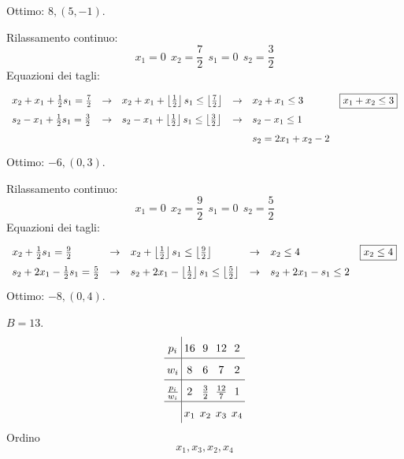 Ottimo: $8,( 5,-1)$.


\Es

Rilassamento continuo:
\begin{equation*}
x_{1} =0\ \ x_{2} =\frac{7}{2} \ \ s_{1} =0\ \ s_{2} =\frac{3}{2}
\end{equation*}
Equazioni dei tagli:
\begin{equation*}
\begin{array}{ l l l l l c }
x_{2} +x_{1} +\frac{1}{2} s_{1} =\frac{7}{2} & \rightarrow  & x_{2} +x_{1} +\left\lfloor \frac{1}{2}\right\rfloor s_{1} \leq \left\lfloor \frac{7}{2}\right\rfloor  & \rightarrow  & x_{2} +x_{1} \leq 3 & \boxed{x_{1} +x_{2} \leq 3}\\
s_{2} -x_{1} +\frac{1}{2} s_{1} =\frac{3}{2} & \rightarrow  & s_{2} -x_{1} +\left\lfloor \frac{1}{2}\right\rfloor s_{1} \leq \left\lfloor \frac{3}{2}\right\rfloor  & \rightarrow  & s_{2} -x_{1} \leq 1 & \\
 &  &  &  & s_{2} =2x_{1} +x_{2} -2 & 
\end{array}
\end{equation*}
Ottimo: $-6,( 0,3)$.


\Es

Rilassamento continuo:
\begin{equation*}
x_{1} =0\ \ x_{2} =\frac{9}{2} \ \ s_{1} =0\ \ s_{2} =\frac{5}{2}
\end{equation*}
Equazioni dei tagli:
\begin{equation*}
\begin{array}{ l l l l l c }
x_{2} +\frac{1}{2} s_{1} =\frac{9}{2} & \rightarrow  & x_{2} +\left\lfloor \frac{1}{2}\right\rfloor s_{1} \leq \left\lfloor \frac{9}{2}\right\rfloor  & \rightarrow  & x_{2} \leq 4 & \boxed{x_{2} \leq 4}\\
s_{2} +2x_{1} -\frac{1}{2} s_{1} =\frac{5}{2} & \rightarrow  & s_{2} +2x_{1} -\left\lfloor \frac{1}{2}\right\rfloor s_{1} \leq \left\lfloor \frac{5}{2}\right\rfloor  & \rightarrow  & s_{2} +2x_{1} -s_{1} \leq 2 & 
\end{array}
\end{equation*}
Ottimo: $-8,( 0,4)$.


\Es

$B=13$.
\begin{equation*}
\arraycolsep=2pt\def\arraystretch{1.6}
\begin{array}{ c|c c c c }
p_{i} & 16 & 9 & 12 & 2\\
\hline
w_{i} & 8 & 6 & 7 & 2\\
\hline
\frac{p_{i}}{w_{i}} & 2 & \frac{3}{2} & \frac{12}{7} & 1\\
\hline
 & x_{1} & x_{2} & x_{3} & x_{4}
\end{array}
\end{equation*}
Ordino
\begin{equation*}
x_{1} ,x_{3} ,x_{2} ,x_{4}
\end{equation*}

